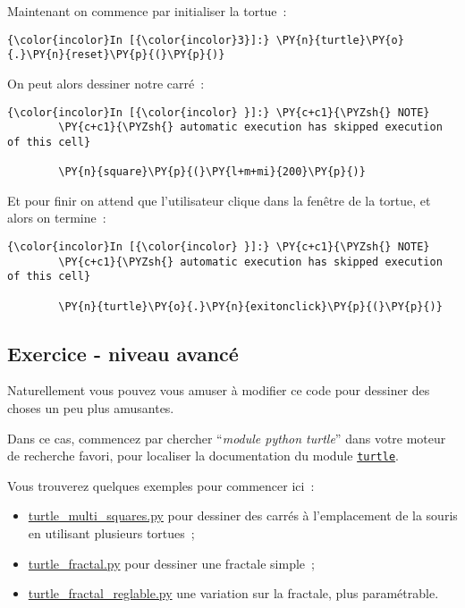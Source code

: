     Maintenant on commence par initialiser la tortue~:

    \begin{Verbatim}[commandchars=\\\{\}]
{\color{incolor}In [{\color{incolor}3}]:} \PY{n}{turtle}\PY{o}{.}\PY{n}{reset}\PY{p}{(}\PY{p}{)}
\end{Verbatim}


    On peut alors dessiner notre carré~:

    \begin{Verbatim}[commandchars=\\\{\}]
{\color{incolor}In [{\color{incolor} }]:} \PY{c+c1}{\PYZsh{} NOTE}
        \PY{c+c1}{\PYZsh{} automatic execution has skipped execution of this cell}
        
        \PY{n}{square}\PY{p}{(}\PY{l+m+mi}{200}\PY{p}{)}
\end{Verbatim}


    Et pour finir on attend que l'utilisateur clique dans la fenêtre de la
tortue, et alors on termine~:

    \begin{Verbatim}[commandchars=\\\{\}]
{\color{incolor}In [{\color{incolor} }]:} \PY{c+c1}{\PYZsh{} NOTE}
        \PY{c+c1}{\PYZsh{} automatic execution has skipped execution of this cell}
        
        \PY{n}{turtle}\PY{o}{.}\PY{n}{exitonclick}\PY{p}{(}\PY{p}{)}
\end{Verbatim}


    \hypertarget{exercice---niveau-avancuxe9}{%
\subsection{Exercice - niveau
avancé}\label{exercice---niveau-avancuxe9}}

    Naturellement vous pouvez vous amuser à modifier ce code pour dessiner
des choses un peu plus amusantes.

Dans ce cas, commencez par chercher ``\emph{module python turtle}'' dans
votre moteur de recherche favori, pour localiser la documentation du
module
\href{https://docs.python.org/3/library/turtle.html}{\texttt{turtle}}.

Vous trouverez quelques exemples pour commencer ici~:

\begin{itemize}
\tightlist
\item
  \href{media/turtle_multi_squares.py}{turtle\_multi\_squares.py} pour
  dessiner des carrés à l'emplacement de la souris en utilisant
  plusieurs tortues~;
\item
  \href{media/turtle_fractal.py}{turtle\_fractal.py} pour dessiner une
  fractale simple~;
\item
  \href{media/turtle_fractal_reglable.py}{turtle\_fractal\_reglable.py}
  une variation sur la fractale, plus paramétrable.
\end{itemize}


    
    
    
